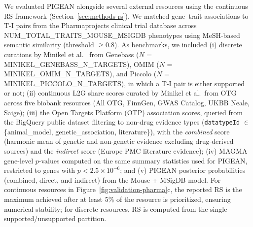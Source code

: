 We evaluated PIGEAN alongside several external resources using the continuous RS framework (Section~\ref{sec:methods-rs}). We matched gene--trait associations to T-I pairs from the Pharmaprojects clinical trial database across {{NUM_TOTAL_TRAITS_MOUSE_MSIGDB}} phenotypes using MeSH-based semantic similarity (threshold $\geq 0.8$). As benchmarks, we included (i) discrete curations by Minikel et al.\ \cite{minikel_refining_2024} from Genebass ($N$ = {{MINIKEL_GENEBASS_N_TARGETS}}), OMIM ($N$ = {{MINIKEL_OMIM_N_TARGETS}}), and Piccolo ($N$ = {{MINIKEL_PICCOLO_N_TARGETS}}), in which a T-I pair is either supported or not; (ii) continuous L2G share scores curated by Minikel et al.\ from OTG across five biobank resources (All OTG, FinnGen, GWAS Catalog, UKBB Neale, Saige); (iii) the Open Targets Platform (OTP) association scores, queried from the BigQuery public dataset filtering to non-drug evidence types (\texttt{datatypeId} $\in$ \{animal\_model, genetic\_association, literature\}), with the \textit{combined} score (harmonic mean of genetic and non-genetic evidence excluding drug-derived sources) and the \textit{indirect} score (Europe PMC literature evidence); (iv) MAGMA gene-level $p$-values \cite{de_leeuw_magma_2015} computed on the same summary statistics used for PIGEAN, restricted to genes with $p < 2.5 \times 10^{-6}$; and (v) PIGEAN posterior probabilities (combined, direct, and indirect) from the Mouse + MSigDB model. For continuous resources in Figure~\ref{fig:validation-pharma}c, the reported RS is the maximum achieved after at least 5\% of the resource is prioritized, ensuring numerical stability; for discrete resources, RS is computed from the single supported/unsupported partition.

